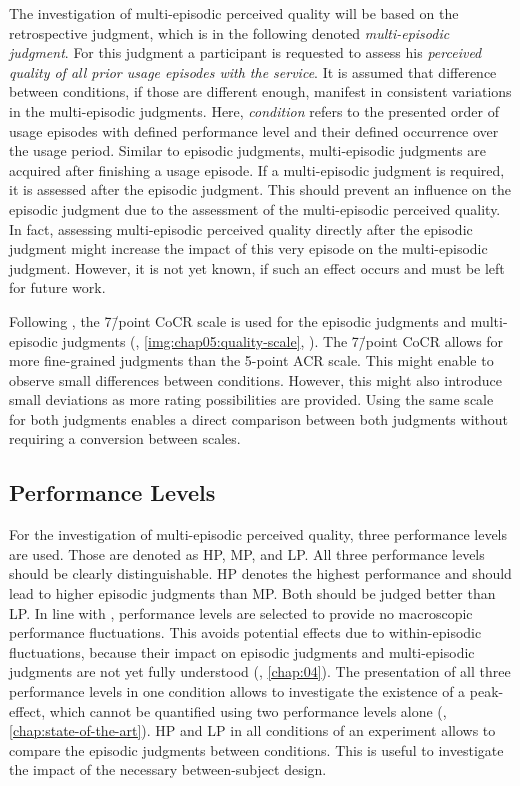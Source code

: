 The investigation of multi-episodic perceived quality will be based on the retrospective judgment, which is in the following denoted \emph{multi-episodic judgment}.
For this judgment a participant is requested to assess his \emph{perceived quality of all prior usage episodes with the service}.
It is assumed that difference between conditions, if those are different enough, manifest in consistent variations in the multi-episodic judgments.
Here, \emph{condition} refers to the presented order of usage episodes with defined performance level and their defined occurrence over the usage period.
Similar to episodic judgments, multi-episodic judgments are acquired after finishing a usage episode.
If a multi-episodic judgment is required, it is assessed after the episodic judgment.
This should prevent an influence on the episodic judgment due to the assessment of the multi-episodic perceived quality.
In fact, assessing multi-episodic perceived quality directly after the episodic judgment might increase the impact of this very episode on the multi-episodic judgment.
However, it is not yet known, if such an effect occurs and must be left for future work.

Following \citet{moller_single-call_2011}, the 7\=/point \acf{CoCR} scale is used for the episodic judgments and multi-episodic judgments (\cf, \autoref{img:chap05:quality-scale}, ).
The 7\=/point \ac{CoCR} allows for more fine-grained judgments than the 5-point \ac{ACR} scale.
This might enable to observe small differences between conditions.
However, this might also introduce small deviations as more rating possibilities are provided.
Using the same scale for both judgments enables a direct comparison between both judgments without requiring a conversion between scales.

\subsection{Performance Levels}
For the investigation of multi-episodic perceived quality, three performance levels are used.
Those are denoted as \acf{HP}, \acf{MP}, and \acf{LP}.
All three performance levels should be clearly distinguishable.
\ac{HP} denotes the highest performance and should lead to higher episodic judgments than \ac{MP}.
Both should be judged better than \ac{LP}.
In line with \citet{moller_single-call_2011}, performance levels are selected to provide no macroscopic performance fluctuations.
This avoids potential effects due to within-episodic fluctuations, because their impact on episodic judgments and multi-episodic judgments are not yet fully understood (\cf, \autoref{chap:04}).
The presentation of all three performance levels in one condition allows to investigate the existence of a peak-effect, which cannot be quantified using two performance levels alone (\cf, \autoref{chap:state-of-the-art}).
\ac{HP} and \ac{LP} in all conditions of an experiment allows to compare the episodic judgments between conditions.
This is useful to investigate the impact of the necessary between-subject design.

